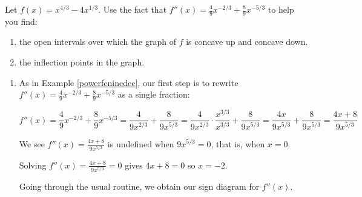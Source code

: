 \documentclass{ximera}
\begin{document}
\begin{example} \label{powerfcnconcavity}  Let $f(x) = x^{4/3} - 4x^{1/3}$.   Use the fact that $f''(x) =  \frac{4}{9} x^{-2/3} + \frac{8}{9} x^{-5/3}$ to help you find:

\begin{enumerate}

\item  the open intervals over which the graph of $f$ is concave up and concave down.

\item  the inflection points in the graph.

\end{enumerate}

\begin{explanation}

\begin{enumerate} \item  As in Example \ref{powerfcnincdec}, our first step is to  rewrite  $f''(x) =  \frac{4}{9} x^{-2/3} + \frac{8}{9} x^{-5/3}$  as a single fraction:


\[ f''(x) = \dfrac{4}{9} x^{-2/3} + \dfrac{8}{9} x^{-5/3} = \dfrac{4}{9x^{2/3}} + \dfrac{8}{9x^{5/3}} =  \dfrac{4}{9x^{2/3}} \cdot \dfrac{x^{3/3}}{x^{3/3}}+ \dfrac{8}{9x^{5/3}}  =  \dfrac{4x}{9x^{5/3}} + \dfrac{8}{9x^{5/3}}   =  \dfrac{4x+8}{9x^{5/3}}  \]



We see $f''(x) =  \frac{4x+8}{9x^{5/3}} $ is undefined when $9x^{5/3}= 0$, that is, when $x = 0$.  


Solving $f''(x) =  \frac{4x+8}{9x^{5/3}}  = 0$ gives $4x+8 = 0$ so $x = -2$. 


Going through the usual routine, we obtain our sign diagram for $f''(x)$.

\begin{image}
\end{image}
\end{enumerate}
\end{explanation}
\end{example}
\end{document}
